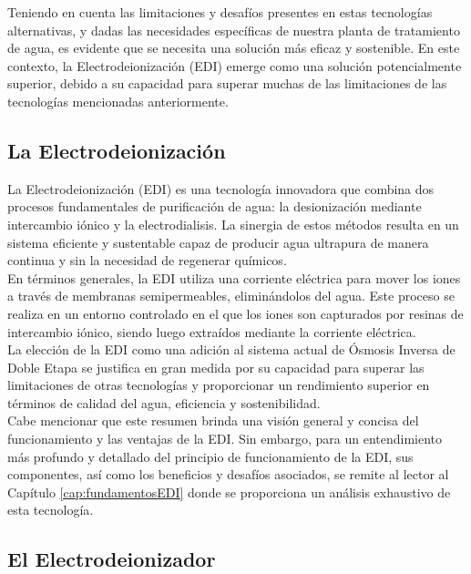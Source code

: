 Teniendo en cuenta las limitaciones y desafíos presentes en estas tecnologías alternativas, y 
dadas las necesidades específicas de nuestra planta de tratamiento de agua, es evidente que se 
necesita una solución más eficaz y sostenible. En este contexto, la Electrodeionización (EDI) 
emerge como una solución potencialmente superior, debido a su capacidad para superar muchas de las 
limitaciones de las tecnologías mencionadas anteriormente.

\subsection{La Electrodeionización}

La Electrodeionización (EDI) es una tecnología innovadora que combina dos procesos 
fundamentales de purificación de agua: la desionización mediante intercambio iónico y 
la electrodialisis. La sinergia de estos métodos resulta en un sistema eficiente y 
sustentable capaz de producir agua ultrapura de manera continua y sin la necesidad 
de regenerar químicos.\\

En términos generales, la EDI utiliza una corriente eléctrica para mover los iones a 
través de membranas semipermeables, eliminándolos del agua. Este proceso se realiza 
en un entorno controlado en el que los iones son capturados por resinas de intercambio 
iónico, siendo luego extraídos mediante la corriente eléctrica.\\

La elección de la EDI como una adición al sistema actual de Ósmosis Inversa de Doble 
Etapa se justifica en gran medida por su capacidad para superar las limitaciones de 
otras tecnologías y proporcionar un rendimiento superior en términos de calidad del 
agua, eficiencia y sostenibilidad.\\

Cabe mencionar que este resumen brinda una visión general y concisa del funcionamiento y 
las ventajas de la EDI. Sin embargo, para un entendimiento más profundo y detallado del 
principio de funcionamiento de la EDI, sus componentes, así como los beneficios y 
desafíos asociados, se remite al lector al Capítulo \ref{cap:fundamentosEDI} donde se proporciona un 
análisis exhaustivo de esta tecnología.\\

\subsection{El Electrodeionizador}

